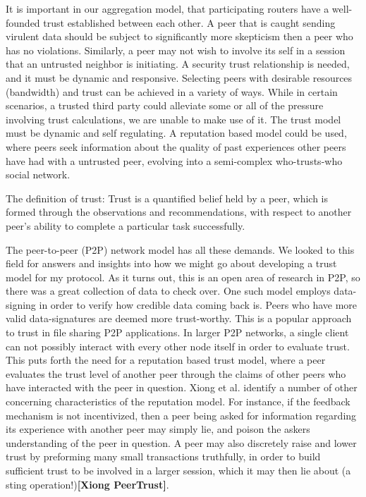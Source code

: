 \documentclass[12pt]{article}
\newcommand{\lcite}[1]
{{\bfseries\color{orange}[#1]}}
\begin{document}
			It is important in our aggregation model, that participating routers have a well-founded trust established between each other. A peer that is caught sending virulent data should be subject to significantly more skepticism then a peer who has no violations. Similarly, a peer may not wish to involve its self in a session that an untrusted neighbor is initiating. A security trust relationship is needed, and it must be dynamic and responsive. Selecting peers with desirable resources (bandwidth) and trust can be achieved in a variety of ways. While in certain scenarios, a trusted third party could alleviate some or all of the pressure involving trust calculations, we are unable to make use of it. The trust model must be dynamic and self regulating. A reputation based model could be used, where peers seek information about the quality of past experiences other peers have had with a untrusted peer, evolving into a semi-complex who-trusts-who social network.

			The definition of trust: Trust is a quantified belief held by a peer, which is formed through the observations and recommendations, with respect to another peer’s ability to complete a particular task successfully. 

			The peer-to-peer (P2P) network model has all these demands. We looked to this field for answers and insights into how we might go about developing a trust model for my protocol. As it turns out, this is an open area of research in P2P, so there was a great collection of data to check over. One such model employs data-signing in order to verify how credible data coming back is. Peers who have more valid data-signatures are deemed more trust-worthy. This is a popular approach to trust in file sharing P2P applications. In larger P2P networks, a single client can not possibly interact with every other node itself in order to evaluate trust. This puts forth the need for a reputation based trust model, where a peer evaluates the trust level of another peer through the claims of other peers who have interacted with the peer in question. Xiong et al. identify a number of other concerning characteristics of the reputation model. For instance, if the feedback mechanism is not incentivized, then a peer being asked for information regarding its experience with another peer may simply lie, and poison the askers understanding of the peer in question. A peer may also discretely raise and lower trust by preforming many small transactions truthfully, in order to build sufficient trust to be involved in a larger session, which it may then lie about (a sting operation!)\lcite{Xiong PeerTrust}.
\end{document}
